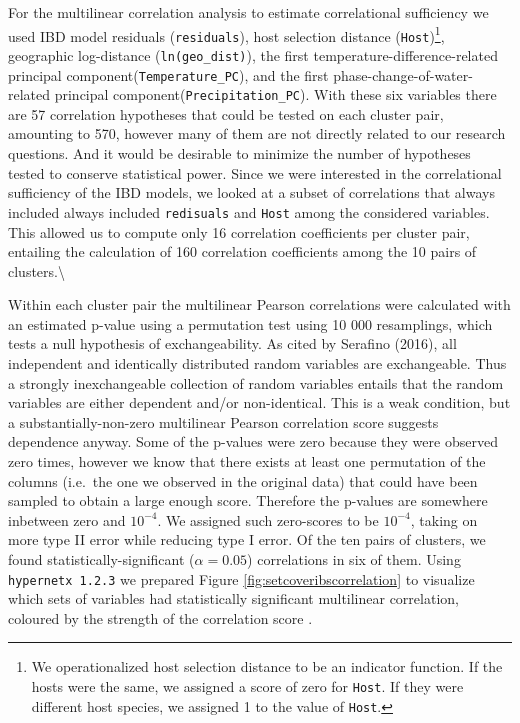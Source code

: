 \documentclass[
  letterpaper,
  DIV=11,
  numbers=noendperiod]{scrreprt}
\begin{document}
For the multilinear correlation analysis to estimate correlational
sufficiency we used IBD model residuals (\texttt{residuals}), host
selection distance
(\texttt{Host})\footnote{We operationalized host selection distance to be an indicator function. If the hosts were the same, we assigned a score of zero for \texttt{Host}. If they were different host species, we assigned 1 to the value of \texttt{Host}.},
geographic log-distance \linebreak (\texttt{ln(geo\_dist)}), the first
temperature-difference-related principal
component\linebreak (\texttt{Temperature\_PC}), and the first
phase-change-of-water-related principal
component\linebreak (\texttt{Precipitation\_PC}). With these six
variables there are 57 correlation hypotheses that could be tested on
each cluster pair, amounting to 570, however many of them are not
directly related to our research questions. And it would be desirable to
minimize the number of hypotheses tested to conserve statistical power.
Since we were interested in the correlational sufficiency of the IBD
models, we looked at a subset of correlations that always included
always included \texttt{redisuals} and \texttt{Host} among the
considered variables. This allowed us to compute only 16 correlation
coefficients per cluster pair, entailing the calculation of 160
correlation coefficients among the 10 pairs of clusters.\textbackslash{}

Within each cluster pair the multilinear Pearson correlations were
calculated with an estimated p-value using a permutation test using 10
000 resamplings, which tests a null hypothesis of exchangeability. As
cited by Serafino (2016), all independent and identically distributed
random variables are exchangeable. Thus a strongly inexchangeable
collection of random variables entails that the random variables are
either dependent and/or non-identical. This is a weak condition, but a
substantially-non-zero multilinear Pearson correlation score suggests
dependence anyway. Some of the p-values were zero because they were
observed zero times, however we know that there exists at least one
permutation of the columns (i.e.~the one we observed in the original
data) that could have been sampled to obtain a large enough score.
Therefore the p-values are somewhere inbetween zero and \(10^{-4}\). We
assigned such zero-scores to be \(10^{-4}\), taking on more type II
error while reducing type I error. Of the ten pairs of clusters, we
found statistically-significant (\(\alpha=0.05\)) correlations in six of
them. Using \texttt{hypernetx 1.2.3} we prepared Figure
\ref{fig:setcoveribscorrelation} to visualize which sets of variables
had statistically significant multilinear correlation, coloured by the
strength of the correlation score \cite{Praggastis2019}.
\end{document}

